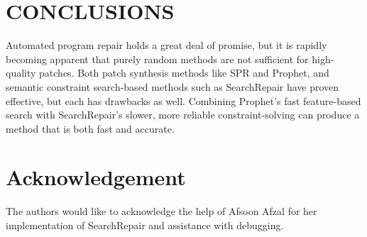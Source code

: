 \documentclass[conference]{IEEEtran}
\begin{document}
\section{CONCLUSIONS}

Automated program repair holds a great deal of promise, but it is rapidly becoming apparent that purely random methods are not sufficient for high-quality patches. 
Both patch synthesis methods like SPR and Prophet, and semantic constraint search-based methods such as SearchRepair have proven effective, but each has drawbacks as well. 
Combining Prophet's fast feature-based search with SearchRepair's slower, more reliable constraint-solving can produce a method that is both fast and accurate. 

\section*{Acknowledgement}
The authors would like to acknowledge the help of Afsoon Afzal for her implementation of SearchRepair and assistance with debugging.



\addtolength{\textheight}{-12cm}   %



%

\end{document}
